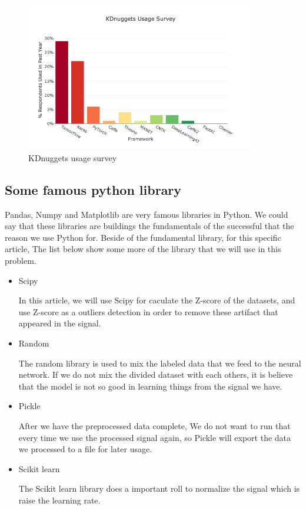     \begin{figure}[h]
        \centering
        \includegraphics[width = 0.9\textwidth]{images/KERA_usage.png} 
        \caption{KDnuggets usage survey}
        \label{fig:marketshare}
    \end{figure}
    
    \subsection{Some famous python library}
    Pandas, Numpy and Matplotlib are very famous libraries in Python. We could say that these libraries are buildings the fundamentals of the successful that the reason we use Python for. Beside of the fundamental library, for this specific article, The list below show some more of the library that we will use in this problem.
    
    \begin{itemize}
        \item Scipy
        
        In this article, we will use Scipy for caculate the Z-score of the datasets, and use Z-score as a outliers detection in order to remove these artifact that appeared in the signal.
        \item Random
        
        The random library is used to mix the labeled data that we feed to the neural network. If we do not mix the divided dataset with each others, it is believe that the model is not so good in learning things from the signal we have.
        \item Pickle
        
        After we have the preprocessed data complete, We do not want to run that every time we use the processed signal again, so Pickle will export the data we processed to a file for later usage.
        \item Scikit learn
        
        The Scikit learn library does a important roll to normalize the signal which is raise the learning rate.
    \end{itemize}
    
